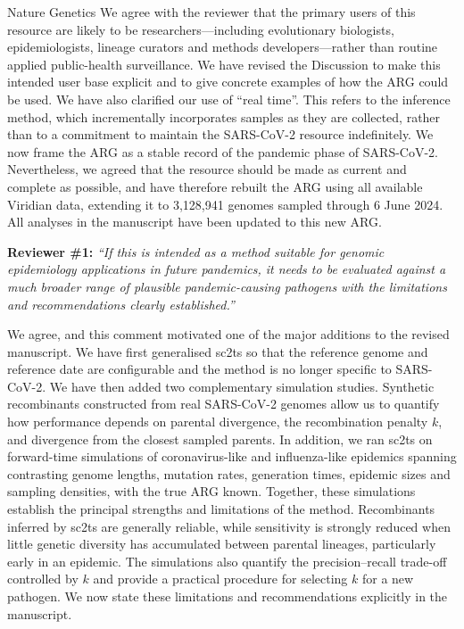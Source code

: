 \documentclass{letter}
\begin{document}
\begin{letter}{Nature Genetics}
We agree with the reviewer that the primary users of this resource are likely
to be researchers---including evolutionary biologists, epidemiologists, lineage
curators and methods developers---rather than routine applied public-health
surveillance. We have revised the Discussion to make this intended user base
explicit and to give concrete examples of how the ARG could be used. We have
also clarified our use of ``real time''. This refers to the inference method,
which incrementally incorporates samples as they are collected, rather than to
a commitment to maintain the SARS-CoV-2 resource indefinitely. We now frame the
ARG as a stable record of the pandemic phase of SARS-CoV-2. Nevertheless, we
agreed that the resource should be made as current and complete as possible,
and have therefore rebuilt the ARG using all available Viridian data, extending
it to 3,128,941 genomes sampled through 6 June 2024. All analyses in the
manuscript have been updated to this new ARG.

\noindent \textbf{Reviewer \#1:} \textit{``If this is intended as a method suitable for
genomic epidemiology applications in future pandemics, it needs to be
evaluated against a much broader range of plausible pandemic-causing pathogens
with the limitations and recommendations clearly established.''}

We agree, and this comment motivated one of the major additions to the revised
manuscript. We have first generalised sc2ts so that the reference genome and
reference date are configurable and the method is no longer specific to
SARS-CoV-2. We have then added two complementary simulation studies. Synthetic
recombinants constructed from real SARS-CoV-2 genomes allow us to quantify how
performance depends on parental divergence, the recombination penalty $k$, and
divergence from the closest sampled parents. In addition, we ran sc2ts on
forward-time simulations of coronavirus-like and influenza-like epidemics
spanning contrasting genome lengths, mutation rates, generation times, epidemic
sizes and sampling densities, with the true ARG known. Together, these
simulations establish the principal strengths and limitations of the method.
Recombinants inferred by sc2ts are generally reliable, while sensitivity is
strongly reduced when little genetic diversity has accumulated between parental
lineages, particularly early in an epidemic. The simulations also quantify the
precision--recall trade-off controlled by $k$ and provide a practical procedure
for selecting $k$ for a new pathogen. We now state these limitations and
recommendations explicitly in the manuscript.


\end{letter}
\end{document}
